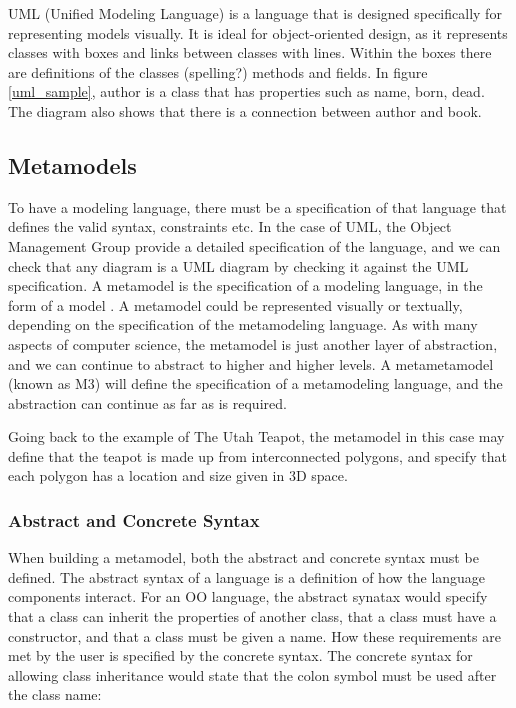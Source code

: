UML (Unified Modeling Language) is a language that is designed specifically for representing models visually. It is ideal for object-oriented design, as it represents classes with boxes and links between classes with lines. Within the boxes there are definitions of the classes (spelling?) methods and fields. In figure \ref{uml_sample}, author is a class that has properties such as name, born, dead. The diagram also shows that there is a connection between author and book.

\subsection{Metamodels}
To have a modeling language, there must be a specification of that language that defines the valid syntax, constraints etc. In the case of UML, the Object Management Group provide a detailed specification \citep{umlSpec} of the language, and we can check that any diagram is a UML diagram by checking it against the UML specification.
A metamodel is the specification of a modeling language, in the form of a model \citep{brambillaBook}. A metamodel could be represented visually or textually, depending on the specification of the metamodeling language. As with many aspects of computer science, the metamodel is just another layer of abstraction, and we can continue to abstract to higher and higher levels. A metametamodel (known as M3) will define the specification of a metamodeling language, and the abstraction can continue as far as is required.

Going back to the example of The Utah Teapot, the metamodel in this case may define that the teapot is made up from interconnected polygons, and specify that each polygon has a location and size given in 3D space. 

\subsubsection{Abstract and Concrete Syntax}

When building a metamodel, both the abstract and concrete syntax must be defined. The abstract syntax of a language is a definition of how the language components interact. For an OO language, the abstract synatax would specify that a class can inherit the properties of another class, that a class must have a constructor, and that a class must be given a name. How these requirements are met by the user is specified by the concrete syntax. The concrete syntax for allowing class inheritance would state that the colon symbol must be used after the class name:

